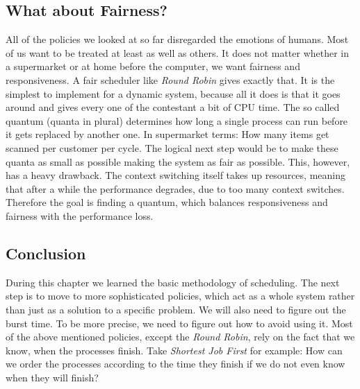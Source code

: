 \subsection{What about Fairness?} \label{sec:rr}

All of the policies we looked at so far disregarded the emotions of humans.
Most of us want to be treated at least as well as others.
It does not matter whether in a supermarket or at home before the computer, we want fairness and responsiveness.
A fair scheduler like \emph{Round Robin} gives exactly that.
It is the simplest to implement for a dynamic system, because all it does is that it goes around and gives every one of the contestant a bit of CPU time.
The so called quantum (quanta in plural) determines how long a single process can run before it gets replaced by another one.
In supermarket terms: How many items get scanned per customer per cycle.
The logical next step would be to make these quanta as small as possible making the system as fair as possible.
This, however, has a heavy drawback.
The context switching itself takes up resources, meaning that after a while the performance degrades, due to too many context switches.
Therefore the goal is finding a quantum, which balances responsiveness and fairness with the performance loss.



 \subsection{Conclusion}

During this chapter we learned the basic methodology of scheduling.
The next step is to move to more sophisticated policies, which act as a whole system rather than just as a solution to a specific problem.
We will also need to figure out the burst time.
To be more precise, we need to figure out how to avoid using it.
Most of the above mentioned policies, except the \emph{Round Robin}, rely on the fact that we know, when the processes finish.
Take \emph{Shortest Job First} for example: How can we order the processes according to the time they finish if we do not even know when they will finish?

